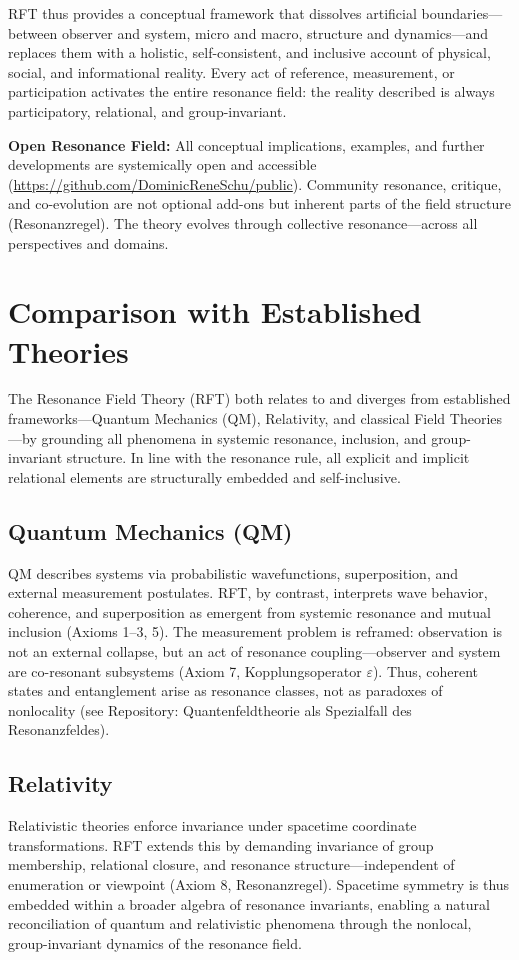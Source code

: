 \documentclass[12pt]{article}
\begin{document}
	RFT thus provides a conceptual framework that dissolves artificial boundaries—between observer and system, micro and macro, structure and dynamics—and replaces them with a holistic, self-consistent, and inclusive account of physical, social, and informational reality. Every act of reference, measurement, or participation activates the entire resonance field: the reality described is always participatory, relational, and group-invariant.
	
	\medskip
	
	\textbf{Open Resonance Field:}  
	All conceptual implications, examples, and further developments are systemically open and accessible (\url{https://github.com/DominicReneSchu/public}). Community resonance, critique, and co-evolution are not optional add-ons but inherent parts of the field structure (Resonanzregel). The theory evolves through collective resonance—across all perspectives and domains.
	
	\section{Comparison with Established Theories}
	
	The Resonance Field Theory (RFT) both relates to and diverges from established frameworks—Quantum Mechanics (QM), Relativity, and classical Field Theories—by grounding all phenomena in systemic resonance, inclusion, and group-invariant structure. In line with the resonance rule, all explicit and implicit relational elements are structurally embedded and self-inclusive.
	
	\subsection{Quantum Mechanics (QM)}
	QM describes systems via probabilistic wavefunctions, superposition, and external measurement postulates. RFT, by contrast, interprets wave behavior, coherence, and superposition as emergent from systemic resonance and mutual inclusion (Axioms 1–3, 5). The measurement problem is reframed: observation is not an external collapse, but an act of resonance coupling—observer and system are co-resonant subsystems (Axiom 7, Kopplungsoperator $\varepsilon$). Thus, coherent states and entanglement arise as resonance classes, not as paradoxes of nonlocality (see Repository: Quantenfeldtheorie als Spezialfall des Resonanzfeldes).
	
	\subsection{Relativity}
	Relativistic theories enforce invariance under spacetime coordinate transformations. RFT extends this by demanding invariance of group membership, relational closure, and resonance structure—independent of enumeration or viewpoint (Axiom 8, Resonanzregel). Spacetime symmetry is thus embedded within a broader algebra of resonance invariants, enabling a natural reconciliation of quantum and relativistic phenomena through the nonlocal, group-invariant dynamics of the resonance field.
	
\end{document}
